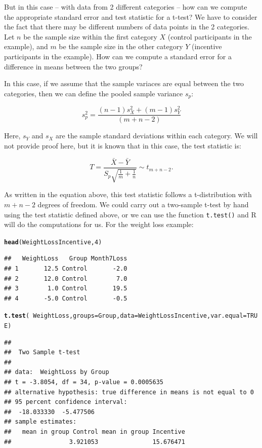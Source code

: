 \documentclass[twoside]{book}\usepackage[]{graphicx}\usepackage[]{xcolor}
\makeatletter
\newcommand{\hlnum}[1]{\textcolor[rgb]{0.686,0.059,0.569}{#1}}%
\newcommand{\hlopt}[1]{\textcolor[rgb]{0,0,0}{#1}}%
\newcommand{\hlstd}[1]{\textcolor[rgb]{0.345,0.345,0.345}{#1}}%
\newcommand{\hlkwc}[1]{\textcolor[rgb]{0.333,0.667,0.333}{#1}}%
\newcommand{\hlkwd}[1]{\textcolor[rgb]{0.737,0.353,0.396}{\textbf{#1}}}%
\newenvironment{kframe}{%
 \def\at@end@of@kframe{}%
 \ifinner\ifhmode%
  \def\at@end@of@kframe{\end{minipage}}%
  \begin{minipage}{\columnwidth}%
 \fi\fi%
 \def\FrameCommand##1{\hskip\@totalleftmargin \hskip-\fboxsep
 \colorbox{shadecolor}{##1}\hskip-\fboxsep
     \hskip-\linewidth \hskip-\@totalleftmargin \hskip\columnwidth}%
 \MakeFramed {\advance\hsize-\width
   \@totalleftmargin\z@ \linewidth\hsize
   \@setminipage}}%
 {\par\unskip\endMakeFramed%
 \at@end@of@kframe}
\newenvironment{knitrout}{}{} %
\newcounter{example}[section]
\makeatother
\begin{document}
But in this case -- with data from 2 different categories -- how can we compute the appropriate standard error and test statistic for a t-test?  We have to consider the fact that there may be different numbers of data points in the 2 categories.  Let $n$ be the sample size within the first category $X$ (control participants in the example), and $m$ be the sample size in the other category $Y$ (incentive participants in the example). How can we compute a standard error for a difference in means between the two groups?

In this case, if we assume that the sample variaces are equal between the two categories, then we can define the pooled sample variance $s_p$:

$$s^2_p = \frac{(n-1)s_X^2 + (m-1)s_Y^2}{(m+n-2)}$$

Here, $s_Y$ and $s_X$ are the sample standard deviations within each category.  We will not provide proof here, but it is known that in this case, the test statistic is:

\[
T = \frac{\bar{X}-\bar{Y}}{S_p\sqrt{\frac{1}{m}+\frac{1}{n}}}
\sim t_{m+n-2}.
\]

As written in the equation above, this test statistic follows a t-distribution with $m+n-2$ degrees of freedom.  We could carry out a two-sample t-test by hand using the test statistic defined above, or we can use the function \texttt{t.test()} and R will do the computations for us. For the weight loss example:

\begin{knitrout}
\color{fgcolor}\begin{kframe}
\begin{alltt}
\hlkwd{head}\hlstd{(WeightLossIncentive,} \hlnum{4}\hlstd{)}
\end{alltt}
\begin{verbatim}
##   WeightLoss   Group Month7Loss
## 1       12.5 Control       -2.0
## 2       12.0 Control        7.0
## 3        1.0 Control       19.5
## 4       -5.0 Control       -0.5
\end{verbatim}
\begin{alltt}
\hlkwd{t.test}\hlstd{(}\hlopt{~}\hlstd{WeightLoss,} \hlkwc{groups} \hlstd{= Group,} \hlkwc{data} \hlstd{= WeightLossIncentive,} \hlkwc{var.equal} \hlstd{=} \hlnum{TRUE}\hlstd{)}
\end{alltt}
\begin{verbatim}
## 
## 	Two Sample t-test
## 
## data:  WeightLoss by Group
## t = -3.8054, df = 34, p-value = 0.0005635
## alternative hypothesis: true difference in means is not equal to 0
## 95 percent confidence interval:
##  -18.033330  -5.477506
## sample estimates:
##   mean in group Control mean in group Incentive 
##                3.921053               15.676471
\end{verbatim}
\end{kframe}
\end{knitrout}
\end{document}
